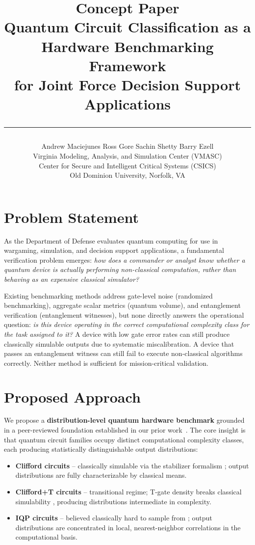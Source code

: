 \documentclass[11pt,twocolumn]{article}
\title{
    \vspace{-1.5em}
    {\large \textbf{Concept Paper}} \\[0.3em]
    {\LARGE \textbf{Quantum Circuit Classification as a}} \\
    {\LARGE \textbf{Hardware Benchmarking Framework}} \\[0.3em]
    {\normalsize for Joint Force Decision Support Applications} \\[0.5em]
    \rule{\linewidth}{0.4pt}
}
\author{
    Andrew Maciejunes \quad Ross Gore \quad Sachin Shetty \quad Barry Ezell \\
    {\small Virginia Modeling, Analysis, and Simulation Center (VMASC)} \\
    {\small Center for Secure and Intelligent Critical Systems (CSICS)} \\
    {\small Old Dominion University, Norfolk, VA}
}
\date{}
\begin{document}
\maketitle
\thispagestyle{empty}
\vspace{-1em}

\section{Problem Statement}

As the Department of Defense evaluates quantum computing
for use in wargaming, simulation, and decision support
applications, a fundamental verification problem emerges:
\textit{how does a commander or analyst know whether a
quantum device is actually performing non-classical
computation, rather than behaving as an expensive
classical simulator?}

Existing benchmarking methods address gate-level noise
(randomized benchmarking), aggregate scalar metrics
(quantum volume), and entanglement verification
(entanglement witnesses), but none directly answers the
operational question: \textit{is this device operating in
the correct computational complexity class for the task
assigned to it?} A device with low gate error rates can
still produce classically simulable outputs due to
systematic miscalibration. A device that passes an
entanglement witness can still fail to execute non-classical
algorithms correctly. Neither method is sufficient for
mission-critical validation.

\section{Proposed Approach}

We propose a \textbf{distribution-level quantum hardware
benchmark} grounded in a peer-reviewed foundation
established in our prior work~\cite{maciejunes2026}. The
core insight is that quantum circuit families occupy
distinct computational complexity classes, each producing
statistically distinguishable output distributions:

\begin{itemize}[leftmargin=*, itemsep=2pt]
    \item \textbf{Clifford circuits} -- classically
    simulable via the stabilizer formalism \cite{gottesman1997stabilizer}; output
    distributions are fully characterizable by classical
    means.
    \item \textbf{Clifford+T circuits} -- transitional
    regime; T-gate density breaks classical simulability \cite{boykin1999universal},
    producing distributions intermediate in complexity.
    \item \textbf{IQP circuits} -- believed classically
    hard to sample from \cite{bremner2016average}; output distributions are
    concentrated in local, nearest-neighbor correlations
    in the computational basis.
\end{itemize}
\end{document}
